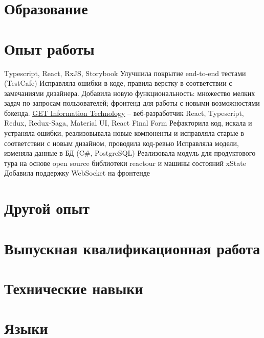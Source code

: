 \documentclass[11pt,a4paper,sans]{moderncv}
\begin{document}
\makecvtitle

\section{Образование}

\section{Опыт работы}
\cvitem {} {Typescript, React, RxJS, Storybook}
\cvitem {} {Улучшила покрытие end-to-end тестами (TestCafe)}
\cvitem {} {Исправляла ошибки в коде, правила верстку в соответствии с замечаниями дизайнера. }
\cvitem {} {Добавила новую функциональность: множество мелких задач по запросам пользователей; фронтенд для работы с новыми возможностями бэкенда.}
\cvitem {}{}
 {\href{hwww.myget-it.com}{\underline{GET Information Technology}} -- веб-разработчик}
 {React, Typescript, Redux, Redux\--Saga, Material UI, React Final Form}
\cvitem {} {Рефакторила код, искала и устраняла ошибки, реализовывала новые компоненты и исправляла старые в соответствии с новым дизайном, проводила код-ревью}
\cvitem {} {Исправляла модели, изменяла данные в БД (C\#, PostgreSQL)}
\cvitem {} {Реализовала модуль для продуктового тура на основе open source библиотеки reactour и машины состояний xState}
\cvitem {} {Добавила поддержку WebSocket на фронтенде}

\section{Другой опыт}

\section{Выпускная квалификационная работа}

\section{Технические навыки}

\section{Языки}
\end{document}
